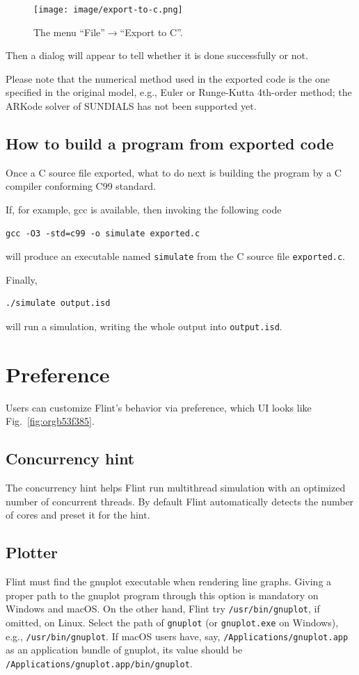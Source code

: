 \documentclass[a4paper,10pt]{report}
\begin{document}
\begin{figure}[htbp]
\centering
\texttt{[image: image/export-to-c.png]}
\caption{\label{fig:org23b1a36}The menu ``File''\(\to\)``Export to C''.}
\end{figure}

Then a dialog will appear to tell whether it is done successfully or not.

Please note that the numerical method used in the exported code is the one
specified in the original model, e.g., Euler or Runge-Kutta 4th-order method;
the ARKode solver of SUNDIALS has not been supported yet.

\subsection{How to build a program from exported code}
\label{sec:org6f8409e}
Once a C source file exported, what to do next is building the program by a C compiler
conforming C99 standard.

If, for example, gcc is available, then invoking the following code
\begin{verbatim}
gcc -O3 -std=c99 -o simulate exported.c
\end{verbatim}
will produce an executable named \texttt{simulate} from the C source file \texttt{exported.c}.

Finally,
\begin{verbatim}
./simulate output.isd
\end{verbatim}
will run a simulation, writing the whole output into \texttt{output.isd}.

\section{\label{org5deb0aa}Preference}
\label{sec:orgb3929b9}
Users can customize Flint's behavior via preference, which UI looks like
Fig.~\ref{fig:orgb53f385}.

\subsection{Concurrency hint}
\label{sec:org77ae382}
The concurrency hint helps Flint run multithread simulation with an optimized number
of concurrent threads. By default Flint automatically detects the number of cores and
preset it for the hint.

\subsection{Plotter}
\label{sec:org5cdeff9}
Flint must find the gnuplot executable when rendering line graphs.
Giving a proper path to the gnuplot program through this option is mandatory on
Windows and macOS. On the other hand, Flint try \texttt{/usr/bin/gnuplot}, if
omitted, on Linux.
Select the path of \texttt{gnuplot} (or \texttt{gnuplot.exe} on Windows), e.g.,
\texttt{/usr/bin/gnuplot}. If macOS users have, say,
\texttt{/Applications/gnuplot.app} as an application bundle of gnuplot,
its value should be \texttt{/Applications/gnuplot.app/bin/gnuplot}.
\end{document}
